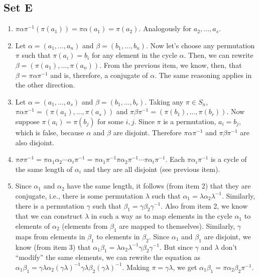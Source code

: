 \documentclass{article}
\begin{document}
\subsection{Set E}
\begin{enumerate}
    \item $\pi\alpha\pi^{-1}(\pi(a_1)) = \pi\alpha(a_1) = \pi(a_2)$. Analogously for $a_2, \ldots, a_s$.

    \item Let $\alpha = (a_1, \ldots, a_n)$ and $\beta = (b_1, \ldots, b_n)$. Now let's choose any permutation $\pi$ such that $\pi(a_i) = b_i$ for any element in the cycle $\alpha$. Then, we can rewrite $\beta = (\pi(a_1), \ldots, \pi(a_n))$. From the previous item, we know, then, that $\beta = \pi\alpha\pi^{-1}$ and is, therefore, a conjugate of $\alpha$. The same reasoning applies in the other direction.

    \item Let $\alpha = (a_1, \ldots, a_s)$ and $\beta = (b_1, \ldots, b_r)$. Taking any $\pi \in S_n$, $\pi\alpha\pi^{-1} = (\pi(a_1), \ldots, \pi(a_s))$ and $\pi\beta\pi^{-1} = (\pi(b_1), \ldots, \pi(b_r))$. Now suppose $\pi(a_i) = \pi(b_j)$ for some $i, j$. Since $\pi$ is a permutation, $a_i = b_j$, which is false, because $\alpha$ and $\beta$ are disjoint. Therefore $\pi\alpha\pi^{-1}$ and $\pi\beta\pi^{-1}$ are also disjoint.

    \item $\pi\sigma\pi^{-1} = \pi\alpha_1\alpha_2\cdots\alpha_t\pi^{-1} = \pi\alpha_1\pi^{-1}\pi\alpha_2\pi^{-1}\cdots\pi\alpha_t\pi^{-1}$. Each $\pi\alpha_i\pi^{-1}$ is a cycle of the same length of $\alpha_i$ and they are all disjoint (see previous item).

    \item Since $\alpha_1$ and $\alpha_2$ have the same length, it follows (from item 2) that they are conjugate, i.e., there is some permutation $\lambda$ such that $\alpha_1 = \lambda\alpha_2\lambda^{-1}$. Similarly, there is a permutation $\gamma$ such that $\beta_1 = \gamma\beta_2\gamma^{-1}$. Also from item 2, we know that we can construct $\lambda$ in such a way as to map elements in the cycle $\alpha_1$ to elements of $\alpha_2$ (elements from $\beta_1$ are mapped to themselves). Similarly, $\gamma$ maps from elements in $\beta_1$ to elements in $\beta_2$. Since $\alpha_1$ and $\beta_1$ are disjoint, we know (from item 3) that $\alpha_1\beta_1 = \lambda\alpha_2\lambda^{-1}\gamma\beta_2\gamma^{-1}$. But since $\gamma$ and $\lambda$ don't ``modify'' the same elements, we can rewrite the equation as $\alpha_1\beta_1 = \gamma\lambda\alpha_2(\gamma\lambda)^{-1}\gamma\lambda\beta_2(\gamma\lambda)^{-1}$. Making $\pi = \gamma\lambda$, we get $\alpha_1\beta_1 = \pi\alpha_2\beta_2\pi^{-1}$.
\end{enumerate}
\end{document}
